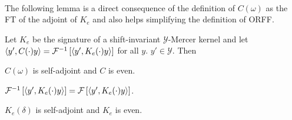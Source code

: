 \paragraph{}
The following lemma is a direct consequence of the definition of $C(\omega)$ as the \acl{FT} of the adjoint of $K_e$ and also helps simplifying the definition of \acs{ORFF}.
\begin{lemma}
\label{lm:C_characterization}
Let $K_e$ be the signature of a shift-invariant $\mathcal{Y}$-Mercer kernel and let $\langle y', C(\cdot)y\rangle=\mathcal{F}^{-1}\left[\langle y', K_e(\cdot)y\rangle\right]$ for all $y$. $y'\in\mathcal{Y}$. Then
\begin{propenum}
\item \label{lm:C_characterization_1} $C(\omega)$ is self-adjoint and $C$ is even.
\item \label{lm:C_characterization_2} $\mathcal{F}^{-1}\left[\langle y', K_e(\cdot)y\rangle\right] = \mathcal{F}\left[\langle y', K_e(\cdot)y\rangle\right]$.
\item \label{lm:C_characterization_3} $K_e(\delta)$ is self-adjoint and $K_e$ is even.
\end{propenum}
\end{lemma}
